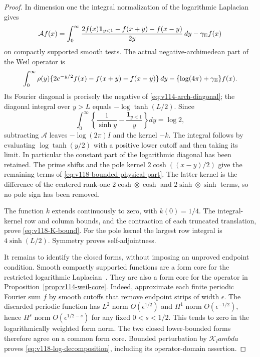 \documentclass[11pt]{article}
\def\lambda{lambda}%
\theoremstyle{remark}
\begin{document}
\begin{proof}
In dimension one the integral normalization of the logarithmic
Laplacian~\cite[Theorem~1.1]{ChenWethLog} gives
\[
 \mathcal A f(x)=\int_0^\infty
 \frac{2f(x)\mathbf1_{y<1}-f(x+y)-f(x-y)}{2y}\,dy
                   -\gamma_{\rm E}f(x)
\]
on compactly supported smooth tests.  The actual negative-archimedean
part of the Weil operator is
\[
 \int_0^\infty\rho(y)
 \{2e^{-y/2}f(x)-f(x+y)-f(x-y)\}\,dy
             -\{\log(4\pi)+\gamma_{\rm E}\}f(x).
\]
Its Fourier diagonal is precisely the negative of
\eqref{eq:v114-arch-diagonal}; the diagonal integral over $y>L$
equals $-\log\tanh(L/2)$.  Since
\[
 \int_0^\infty\left\{\frac1{\sinh y}
                -\frac{\mathbf1_{y<1}}y\right\}dy=\log2,
\]
subtracting $\mathcal A$ leaves $-\log(2\pi)I$ and the kernel $-k$.
The integral follows by evaluating $\log\tanh(y/2)$ with a positive
lower cutoff and then taking its limit.  In particular the constant
part of the logarithmic diagonal has been retained.
The prime shifts and the pole kernel $2\cosh((x-y)/2)$ give the
remaining terms of \eqref{eq:v118-bounded-physical-part}.
The latter kernel is the difference of the centered rank-one
$2\cosh\otimes\cosh$ and $2\sinh\otimes\sinh$ terms, so no pole
sign has been removed.

The function $k$ extends continuously to zero, with $k(0)=1/4$.
The integral-kernel row and column bounds, and the contraction of
each truncated translation, prove \eqref{eq:v118-K-bound}.
For the pole kernel the largest row integral is
$4\sinh(L/2)$.  Symmetry proves self-adjointness.

It remains to identify the closed forms, without imposing an
unproved endpoint condition.  Smooth compactly supported functions
are a form core for the restricted logarithmic
Laplacian~\cite[Theorem~3.1]{ChenWethLog}.  They are also a form core
for the operator in Proposition~\ref{prop:v114-weil-core}.
Indeed, approximate each finite periodic Fourier sum $f$ by smooth
cutoffs that remove endpoint strips of width $\epsilon$.
The discarded periodic function has $L^2$ norm $O(\epsilon^{1/2})$
and $H^1$ norm $O(\epsilon^{-1/2})$, hence $H^s$ norm
$O(\epsilon^{1/2-s})$ for any fixed $0<s<1/2$.
This tends to zero in the logarithmically weighted form norm.
The two closed lower-bounded forms therefore agree on a common form
core.  Bounded perturbation by $\mathcal K_\lambda$ proves
\eqref{eq:v118-log-decomposition}, including its operator-domain assertion.
\end{proof}
\end{document}
